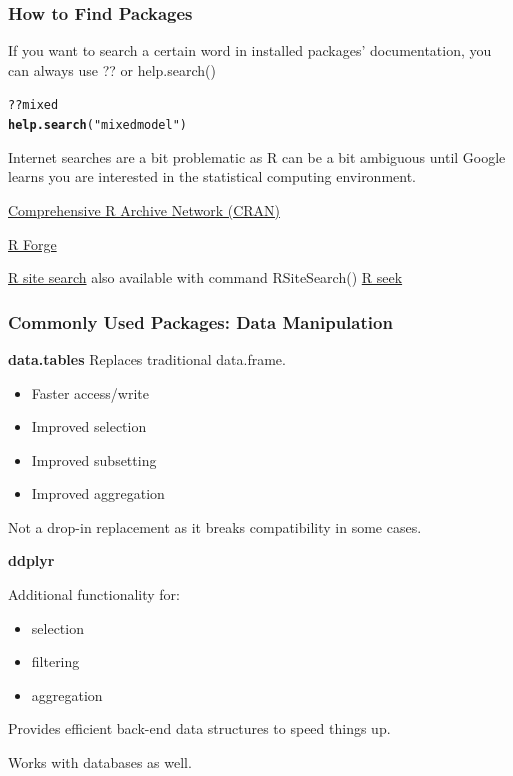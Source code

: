 \documentclass{beamer}\usepackage[]{graphicx}\usepackage[]{color}
\makeatletter
\newcommand{\hlstr}[1]{\textcolor[rgb]{0.192,0.494,0.8}{#1}}%
\newcommand{\hlopt}[1]{\textcolor[rgb]{0,0,0}{#1}}%
\newcommand{\hlstd}[1]{\textcolor[rgb]{0.345,0.345,0.345}{#1}}%
\newcommand{\hlkwd}[1]{\textcolor[rgb]{0.737,0.353,0.396}{\textbf{#1}}}%
\newenvironment{kframe}{%
 \def\at@end@of@kframe{}%
 \ifinner\ifhmode%
  \def\at@end@of@kframe{\end{minipage}}%
  \begin{minipage}{\columnwidth}%
 \fi\fi%
 \def\FrameCommand##1{\hskip\@totalleftmargin \hskip-\fboxsep
 \colorbox{shadecolor}{##1}\hskip-\fboxsep
     \hskip-\linewidth \hskip-\@totalleftmargin \hskip\columnwidth}%
 \MakeFramed {\advance\hsize-\width
   \@totalleftmargin\z@ \linewidth\hsize
   \@setminipage}}%
 {\par\unskip\endMakeFramed%
 \at@end@of@kframe}
\newenvironment{knitrout}{}{} %
\makeatother
\begin{document}
\begin{frame}[fragile]
\frametitle{How to Find Packages}

If you want to search a certain word in installed packages' documentation, you can always use ?? or help.search()

\begin{knitrout}\scriptsize
{}\color{fgcolor}\begin{kframe}
\begin{alltt}
\hlopt{??}\hlstd{mixed}
\hlkwd{help.search}\hlstd{(}\hlstr{"mixed model"}\hlstd{)}
\end{alltt}
\end{kframe}
\end{knitrout}

Internet searches are a bit problematic as R can be a bit ambiguous until Google learns you are interested in the statistical computing environment.
\vfill

\href{https://cran.r-project.org/web/packages/}{Comprehensive R Archive Network (CRAN)}
\vfill

\href{https://r-forge.r-project.org/}{R Forge}
\vfill

\href{http://search.r-project.org}{R site search} also available with command RSiteSearch()
\vfill
\href{http://rseek.org/}{R seek}

\end{frame}

\begin{frame}
\frametitle{Commonly Used Packages: Data Manipulation}

\textbf{data.tables} Replaces traditional data.frame. 
\begin{itemize}
	\item Faster access/write
	\item Improved selection 
	\item Improved subsetting 
	\item Improved aggregation 
\end{itemize}

Not a drop-in replacement as it breaks compatibility in some cases.

\vspace{1em}

\textbf{ddplyr}

Additional functionality for:
\begin{itemize}
	\item selection
	\item filtering
	\item aggregation
\end{itemize}

Provides efficient back-end data structures to speed things up. 

Works with databases as well.

\end{frame}
\end{document}
